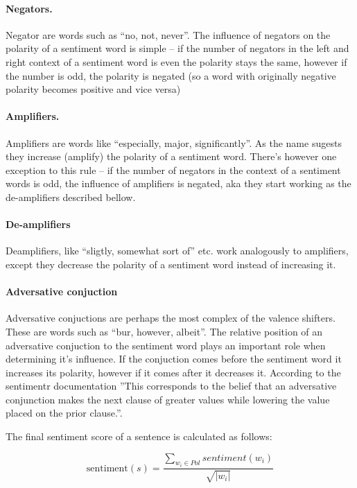 \paragraph{Negators.} Negator are words such as ``no, not, never''. The influence of negators on the polarity of a sentiment word is simple -- if the number of negators in the left and right context of a sentiment word is even the polarity stays the same, however if the number is odd, the polarity is negated (so a word with originally negative polarity becomes positive and vice versa)

\paragraph{Amplifiers.} Amplifiers are words like ``especially, major, significantly''. As the name sugests they increase (amplify) the polarity of a sentiment word. There's however one exception to this rule -- if the number of negators in the context of a sentiment words is odd, the influence of amplifiers is negated, aka they start working as the de-amplifiers described bellow.

\paragraph{De-amplifiers} Deamplifiers, like ``sligtly, somewhat sort of'' etc. work analogously to amplifiers, except they decrease the polarity of a sentiment word instead of increasing it.

\paragraph{Adversative conjuction} Adversative conjuctions are perhaps the most complex of the valence shifters. These are words such as ``bur, however, albeit''. The relative position of an adversative conjuction to the sentiment word plays an important role when determining it's influence. If the conjuction comes before the sentiment word it increases its polarity, however if it comes after it decreases it. According to the sentimentr documentation ''This corresponds to the belief that an adversative conjunction makes the next clause of greater values while lowering the value placed on the prior clause.''. \cite{sentimentr}


The final sentiment score of a sentence is calculated as follows:

$$\textrm{sentiment}(s) = \frac{\sum_{w_{i} \in Pol} sentiment(w_{i})}{\sqrt{|w_{i}|}}$$

